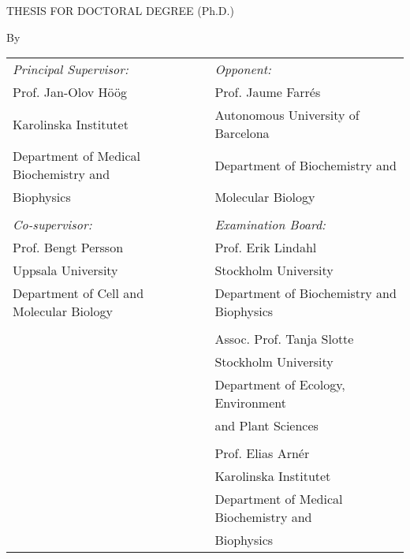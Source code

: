 
{\Large \noindent \MakeUppercase{\thesistitle}\par}
\vspace{0.5cm}
{\Large \noindent THESIS FOR DOCTORAL DEGREE (Ph.D.) \par}
\vspace{0.5cm}
{\noindent By \par}
\vspace{0.5cm}
{\Large \noindent \bf \thesisauthor\par}
\vspace{0.5cm}

{\small
\begin{flushleft}
\begin{tabularx}{\textwidth}{lXl}
{\em Principal Supervisor:} & & {\em Opponent:}\\
Prof. Jan-Olov Höög & & Prof. Jaume Farrés\\
Karolinska Institutet & & Autonomous University of Barcelona\\
Department of Medical Biochemistry and & & Department of Biochemistry and \\
Biophysics & & Molecular Biology\\
\\
{\em Co-supervisor:} & & {\em Examination Board:}\\
Prof. Bengt Persson & & Prof. Erik Lindahl\\
Uppsala University & & Stockholm University\\
Department of Cell and Molecular Biology & & Department of Biochemistry and Biophysics\\
\\
& & Assoc. Prof. Tanja Slotte\\
& & Stockholm University\\
& & Department of Ecology, Environment \\
& & and Plant Sciences\\
\\
& & Prof. Elias Arnér\\
& & Karolinska Institutet\\
& & Department of Medical Biochemistry and\\
& & Biophysics\\
\end{tabularx}
\end{flushleft}
}

\thispagestyle{empty}

\restoregeometry